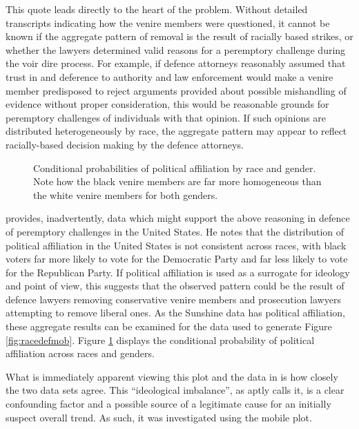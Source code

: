 This quote leads directly to the heart of the problem. Without detailed transcripts indicating how the venire members were
questioned, it cannot be known if the aggregate pattern of removal is the result of racially based strikes, or whether the lawyers
determined valid reasons for a peremptory challenge during the voir dire process. For example, if defence attorneys reasonably
assumed that trust in and deference to authority and law enforcement would make a venire member predisposed to reject arguments
provided about possible mishandling of evidence without proper consideration, this would be reasonable grounds for peremptory
challenges of individuals with that opinion. If such opinions are distributed heterogeneously by race, the aggregate pattern may
appear to reflect racially-based decision making by the defence attorneys. 

\begin{figure}[h!]
  \centering
  \caption[Political Affiliation by Race and Gender (Sunshine)]
  {Conditional probabilities of political affiliation by race and gender. Note how the black venire members are far more
    homogeneous than the white venire members for both genders.} 
  \label{fig:racepolit}
\end{figure}

\cite{revesz2016} provides, inadvertently, data which might support the above reasoning in defence of peremptory challenges in the
United States. He notes that the distribution of political affiliation in the United States is not consistent across races, with
black voters far more likely to vote for the Democratic Party and far less likely to vote for the Republican Party. If political
affiliation is used as a surrogate for ideology and point of view, this suggests that the observed pattern could be the result of
defence lawyers removing conservative venire members and prosecution lawyers attempting to remove liberal ones. As the Sunshine
data has political affiliation, these aggregate results can be examined for the data used to generate Figure
\ref{fig:racedefmob}. Figure \ref{fig:racepolit} displays the conditional probability of political affiliation across races and
genders.

What is immediately apparent viewing this plot and the data in \cite{revesz2016} is how closely the two data sets agree. This
``ideological imbalance'', as \citeauthor{revesz2016} aptly calls it, is a clear confounding factor and a possible source of a
legitimate cause for an initially suspect overall trend. As such, it was investigated using the mobile plot.

